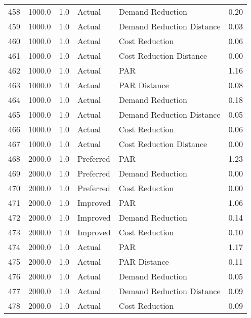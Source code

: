 \begin{longtable}{lrrllr}
458  &       1000.0 &     1.0 &         Actual &           Demand Reduction &   0.20 \\
459  &       1000.0 &     1.0 &         Actual &  Demand Reduction Distance &   0.03 \\
460  &       1000.0 &     1.0 &         Actual &             Cost Reduction &   0.06 \\
461  &       1000.0 &     1.0 &         Actual &    Cost Reduction Distance &   0.00 \\
462  &       1000.0 &     1.0 &         Actual &                        PAR &   1.16 \\
463  &       1000.0 &     1.0 &         Actual &               PAR Distance &   0.08 \\
464  &       1000.0 &     1.0 &         Actual &           Demand Reduction &   0.18 \\
465  &       1000.0 &     1.0 &         Actual &  Demand Reduction Distance &   0.05 \\
466  &       1000.0 &     1.0 &         Actual &             Cost Reduction &   0.06 \\
467  &       1000.0 &     1.0 &         Actual &    Cost Reduction Distance &   0.00 \\
468  &       2000.0 &     1.0 &      Preferred &                        PAR &   1.23 \\
469  &       2000.0 &     1.0 &      Preferred &           Demand Reduction &   0.00 \\
470  &       2000.0 &     1.0 &      Preferred &             Cost Reduction &   0.00 \\
471  &       2000.0 &     1.0 &       Improved &                        PAR &   1.06 \\
472  &       2000.0 &     1.0 &       Improved &           Demand Reduction &   0.14 \\
473  &       2000.0 &     1.0 &       Improved &             Cost Reduction &   0.10 \\
474  &       2000.0 &     1.0 &         Actual &                        PAR &   1.17 \\
475  &       2000.0 &     1.0 &         Actual &               PAR Distance &   0.11 \\
476  &       2000.0 &     1.0 &         Actual &           Demand Reduction &   0.05 \\
477  &       2000.0 &     1.0 &         Actual &  Demand Reduction Distance &   0.09 \\
478  &       2000.0 &     1.0 &         Actual &             Cost Reduction &   0.09 \\

\end{longtable}
